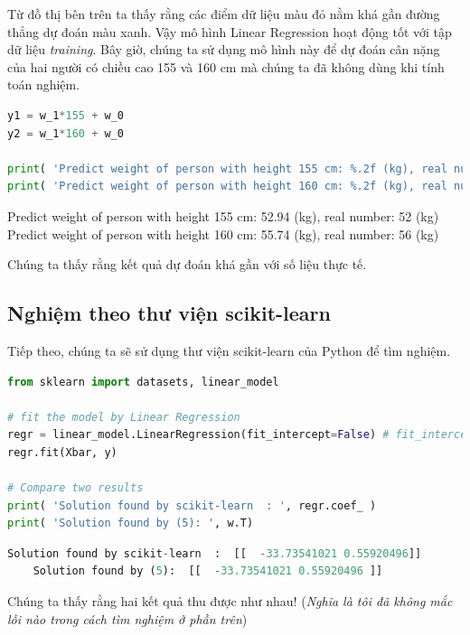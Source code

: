 Từ đồ thị bên trên ta thấy rằng các điểm dữ liệu màu đỏ nằm khá gần đường thẳng dự đoán màu xanh. Vậy mô hình Linear Regression hoạt động tốt với tập dữ liệu \textit{training}. Bây giờ, chúng ta sử dụng mô hình này để dự đoán cân nặng của hai người có chiều cao 155 và 160 cm mà chúng ta đã không dùng khi tính toán nghiệm. 
 
 
\begin{lstlisting}[language=Python]
y1 = w_1*155 + w_0 
y2 = w_1*160 + w_0 
 
print( 'Predict weight of person with height 155 cm: %.2f (kg), real number: 52 (kg)'  %(y1) ) 
print( 'Predict weight of person with height 160 cm: %.2f (kg), real number: 56 (kg)'  %(y2) ) 
\end{lstlisting}
 
    Predict weight of person with height 155 cm: 52.94 (kg), real number: 52 (kg) 
    Predict weight of person with height 160 cm: 55.74 (kg), real number: 56 (kg) 
 
 
 
Chúng ta thấy rằng kết quả dự đoán khá gần với số liệu thực tế. 
 
 
\subsection{Nghiệm theo thư viện scikit-learn}
 
Tiếp theo, chúng ta sẽ sử dụng thư viện scikit-learn của Python để tìm nghiệm.  
 
 
\begin{lstlisting}[language=Python]
from sklearn import datasets, linear_model 
 
# fit the model by Linear Regression 
regr = linear_model.LinearRegression(fit_intercept=False) # fit_intercept = False for calculating the bias 
regr.fit(Xbar, y) 
 
# Compare two results 
print( 'Solution found by scikit-learn  : ', regr.coef_ ) 
print( 'Solution found by (5): ', w.T) 
\end{lstlisting}
 
\begin{lstlisting}[language=Python]
    Solution found by scikit-learn  :  [[  -33.73541021 0.55920496]] 
    Solution found by (5):  [[  -33.73541021 0.55920496 ]] 
\end{lstlisting}
 
Chúng ta thấy rằng hai kết quả thu được như nhau! (\textit{Nghĩa là tôi đã không mắc lỗi nào trong cách tìm nghiệm ở phần trên}) 
 
